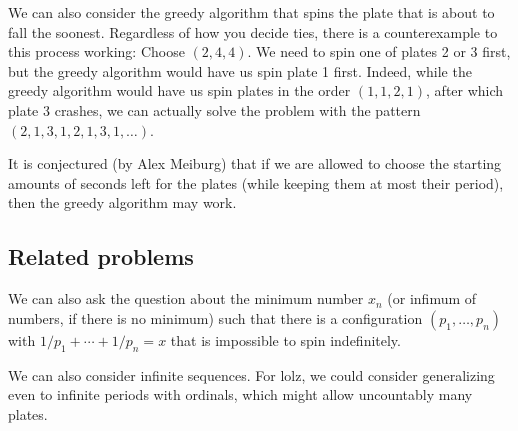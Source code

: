 We can also consider the greedy algorithm that spins the plate that is about to fall the soonest. Regardless of how you decide ties, there is a counterexample to this process working: Choose $(2,4,4)$. We need to spin one of plates 2 or 3 first, but the greedy algorithm would have us spin plate 1 first. Indeed, while the greedy algorithm would have us spin plates in the order $(1,1,2,1)$, after which plate 3 crashes, we can actually solve the problem with the pattern $(2,1,3,1,2,1,3,1,\ldots)$.

It is conjectured (by Alex Meiburg) that if we are allowed to choose the starting amounts of seconds left for the plates (while keeping them at most their period), then the greedy algorithm may work.

\subsection{Related problems}

We can also ask the question about the minimum number $x_n$ (or infimum of numbers, if there is no minimum) such that there is a configuration $(p_1,\ldots,p_n)$ with $1/p_1+\cdots+1/p_n=x$ that is impossible to spin indefinitely.

We can also consider infinite sequences. For lolz, we could consider generalizing even to infinite periods with ordinals, which might allow uncountably many plates.

